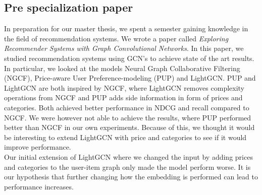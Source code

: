 \subsection{Pre specialization paper}\label{sec:pre-specialization-paper}
In preparation for our master thesis, we spent a semester gaining knowledge in the field of recommendation systems.
We wrote a paper called \textit{Exploring Recommender Systems with Graph Convolutional Networks}.
In this paper, we studied recommendation systems using GCN's to achieve state of the art results.
In particular, we looked at the models Neural Graph Collaborative Filtering (NGCF), Price-aware User Preference-modeling (PUP) and LightGCN.
PUP and LightGCN are both inspired by NGCF, where LightGCN removes complexity operations from NGCF and PUP adds side information in form of prices and categories.
Both achieved better performance in NDCG and recall compared to NGCF.
We were however not able to achieve the results, where PUP performed better than NGCF in our own experiments.
Because of this, we thought it would be interesting to extend LightGCN with price and categories to see if it would improve performance.
\\
Our initial extension of LightGCN where we changed the input by adding prices and categories to the user-item graph only made the model perform worse.
It is our hypothesis that further changing how the embedding is performed can lead to performance increases.
